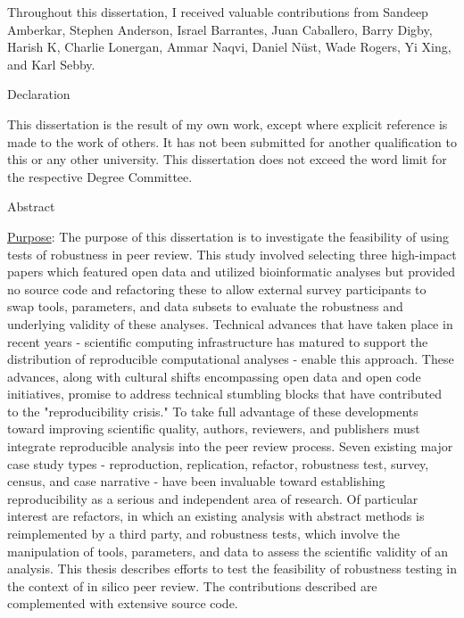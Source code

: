 \documentclass{drexelthesis}
\begin{document}
Throughout this dissertation, I received valuable contributions from Sandeep Amberkar, Stephen Anderson, Israel Barrantes, Juan Caballero, Barry Digby, Harish K, Charlie Lonergan, Ammar Naqvi, Daniel Nüst, Wade Rogers, Yi Xing, and Karl Sebby.


{\Large Declaration}

This dissertation is the result of my own work, except where explicit reference is made to the work of others. It has not been submitted for another qualification to this or any other university. This dissertation does not exceed the word limit for the respective Degree Committee.

\newpage
\tableofcontents

\listoftables

\listoffigures



\clearpage
\newpage 


{\Large Abstract}

\uline{Purpose}: The purpose of this dissertation is to investigate the feasibility of using tests of robustness in peer review. This study involved selecting three high-impact papers which featured open data and utilized bioinformatic analyses but provided no source code and refactoring these to allow external survey participants to swap tools, parameters, and data subsets to evaluate the robustness and underlying validity of these analyses. Technical advances that have taken place in recent years - scientific computing infrastructure has matured to support the distribution of reproducible computational analyses - enable this approach. These advances, along with cultural shifts encompassing open data and open code initiatives, promise to address technical stumbling blocks that have contributed to the "reproducibility crisis." To take full advantage of these developments toward improving scientific quality, authors, reviewers, and publishers must integrate reproducible analysis into the peer review process. Seven existing major case study types - reproduction, replication, refactor, robustness test, survey, census, and case narrative - have been invaluable toward establishing reproducibility as a serious and independent area of research. Of particular interest are refactors, in which an existing analysis with abstract methods is reimplemented by a third party, and robustness tests, which involve the manipulation of tools, parameters, and data to assess the scientific validity of an analysis. This thesis describes efforts to test the feasibility of robustness testing in the context of in silico peer review. The contributions described are complemented with extensive source code.
\end{document}
